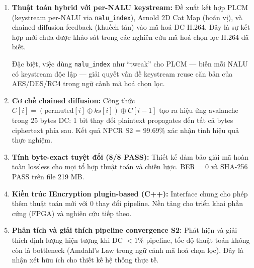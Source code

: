 \begin{enumerate}
  \item \textbf{Thuật toán hybrid với per-NALU keystream:}
        Đề xuất kết hợp PLCM (keystream per-NALU via \texttt{nalu\_index}),
        Arnold 2D Cat Map (hoán vị), và chained diffusion feedback (khuếch tán)
        vào mã hoá DC H.264. Đây là sự kết hợp mới chưa được khảo sát trong
        các nghiên cứu mã hoá chọn lọc H.264 đã biết.

        Đặc biệt, việc dùng \texttt{nalu\_index} như ``tweak'' cho PLCM
        --- biến mỗi NALU có keystream độc lập --- giải quyết vấn đề keystream
        reuse căn bản của AES/DES/RC4 trong ngữ cảnh mã hoá chọn lọc.

  \item \textbf{Cơ chế chained diffusion:}
        Công thức $C[i] = (\text{permuted}[i] \oplus ks[i]) \oplus C[i-1]$
        tạo ra hiệu ứng avalanche trong 25 bytes DC: 1 bit thay đổi plaintext
        propagates đến tất cả bytes ciphertext phía sau. Kết quả NPCR S2 = $99.69\%$
        xác nhận tính hiệu quả thực nghiệm.

  \item \textbf{Tính byte-exact tuyệt đối (8/8 PASS):}
        Thiết kế đảm bảo giải mã hoàn toàn lossless cho mọi tổ hợp thuật toán
        và chiến lược. BER = 0 và SHA-256 PASS trên file 219 MB.

  \item \textbf{Kiến trúc IEncryption plugin-based (C++):}
        Interface chung cho phép thêm thuật toán mới với 0 thay đổi pipeline.
        Nền tảng cho triển khai phần cứng (FPGA) và nghiên cứu tiếp theo.

  \item \textbf{Phân tích và giải thích pipeline convergence S2:}
        Phát hiện và giải thích định lượng hiện tượng khi DC $< 1\%$ pipeline,
        tốc độ thuật toán không còn là bottleneck (Amdahl's Law trong ngữ cảnh
        mã hoá chọn lọc). Đây là nhận xét hữu ích cho thiết kế hệ thống thực tế.
\end{enumerate}

